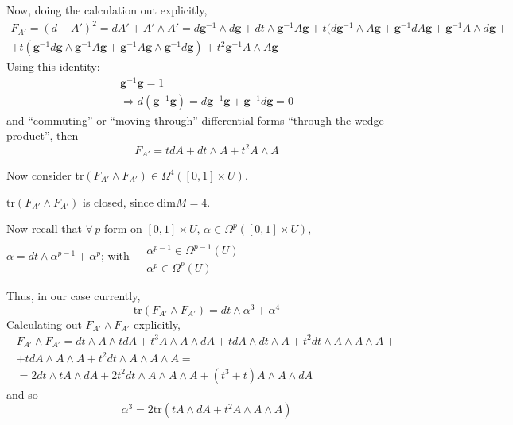 \documentclass[10pt]{amsart}
\begin{document}
Now, doing the calculation out explicitly,
\[
\begin{gathered}
F_{A'} = (d+A')^2 = dA' + A'\wedge A' = d\mathbf{g}^{-1} \wedge d\mathbf{g} + dt \wedge \mathbf{g}^{-1} A \mathbf{g} + t(d\mathbf{g}^{-1} \wedge A \mathbf{g} + \mathbf{g}^{-1} dA \mathbf{g} + \mathbf{g}^{-1} A \wedge d\mathbf{g} + \\
 + t(\mathbf{g}^{-1} d\mathbf{g} \wedge \mathbf{g}^{-1} A \mathbf{g} + \mathbf{g}^{-1} A \mathbf{g} \wedge \mathbf{g}^{-1} d\mathbf{g} ) + t^2 \mathbf{g}^{-1} A \wedge A \mathbf{g}
\end{gathered}
\]
Using this identity:
\[
\begin{gathered}
  \mathbf{g}^{-1} \mathbf{g} = 1 \\ 
  \Longrightarrow d( \mathbf{g}^{-1} \mathbf{g} ) = d\mathbf{g}^{-1} \mathbf{g} + \mathbf{g}^{-1} d\mathbf{g} = 0 
\end{gathered}
\]
and ``commuting'' or ``moving through'' differential forms ``through the wedge product'', then
\[
F_{A'} = tdA + dt \wedge A + t^2 A \wedge A
\]

Now consider $\text{tr}(F_{A'} \wedge F_{A'} ) \in \Omega^4([0,1]\times U)$.  

$\text{tr}(F_{A'} \wedge F_{A'})$ is closed, since $\text{dim}M = 4$.  

Now recall that $\forall \, p$-form on $[0,1] \times U$, $\alpha \in \Omega^p([0,1]\times U)$, $\alpha = dt \wedge \alpha^{p-1} + \alpha^p$; with $\begin{aligned} & \quad \\ 
  & \alpha^{p-1} \in \Omega^{p-1}(U) \\
  & \alpha^p \in \Omega^p(U) \end{aligned}$

Thus, in our case currently, 
\[
\text{tr}(F_{A'} \wedge F_{A'}) = dt \wedge \alpha^3 + \alpha^4
\]
Calculating out $F_{A'} \wedge F_{A'}$ explicitly,
\[
\begin{gathered}
  F_{A'} \wedge F_{A'} = dt \wedge A \wedge tdA + t^3 A \wedge A \wedge dA + tdA \wedge dt \wedge A + t^2 dt \wedge A \wedge A \wedge A + \\
  + tdA \wedge A \wedge A + t^2 dt \wedge A \wedge A \wedge A =  \\
   = 2dt \wedge tA \wedge dA + 2 t^2 dt \wedge A \wedge A \wedge A + (t^3 + t) A\wedge A \wedge dA
\end{gathered}
\]
and so 
\[
\alpha^3 = 2\text{tr}(tA \wedge dA + t^2 A \wedge A \wedge A)
\]
\end{document}
